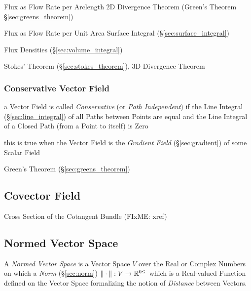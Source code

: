 Flux as Flow Rate per Arclength \fist 2D Divergence Theorem (Green's Theorem
\S\ref{sec:greens_theorem})

Flux as Flow Rate per Unit Area \fist Surface Integral
(\S\ref{sec:surface_integral})

Flux Densities \fist (\S\ref{sec:volume_integral})

Stokes' Theorem (\S\ref{sec:stokes_theorem}), 3D Divergence Theorem



\subsubsection{Conservative Vector Field}\label{sec:conservative_vector_field}

a Vector Field is called \emph{Conservative} (or \emph{Path Independent}) if
the Line Integral (\S\ref{sec:line_integral}) of all Paths between Points are
equal and the Line Integral of a Closed Path (from a Point to itself) is Zero

this is true when the Vector Field is the \emph{Gradient Field}
(\S\ref{sec:gradient}) of some Scalar Field

\fist Green's Theorem (\S\ref{sec:greens_theorem})



\subsection{Covector Field}\label{sec:covector_field}

Cross Section of the Cotangent Bundle (FIxME: xref)



\subsection{Normed Vector Space}\label{sec:normed_vectorspace}

A \emph{Normed Vector Space} is a Vector Space $V$ over the Real or Complex
Numbers on which a \emph{Norm} (\S\ref{sec:norm}) $\|\cdot\| : V \rightarrow
\mathbb{R}^{0\leq}$ which is a Real-valued Function defined on the Vector Space
formalizing the notion of \emph{Distance} between Vectors.


